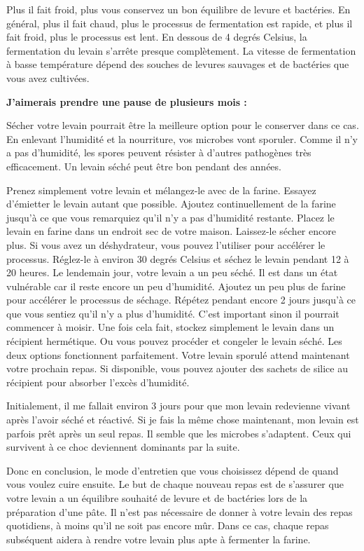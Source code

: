Plus il fait froid, plus vous conservez un bon équilibre de levure et
bactéries. En général, plus il fait chaud, plus le processus de fermentation est rapide,
et plus il fait froid, plus le processus est lent.
En dessous de 4 degrés Celsius, la fermentation du levain s'arrête presque complètement. La
vitesse de fermentation à basse température dépend des
souches de levures sauvages et de bactéries
que vous avez cultivées.

\textbf{J'aimerais prendre une pause de plusieurs mois :}

Sécher votre levain pourrait être la meilleure option pour le conserver dans ce cas. En
enlevant l'humidité et la nourriture, vos microbes vont sporuler. Comme il n'y a pas
d'humidité, les spores peuvent résister à d'autres pathogènes très efficacement. Un levain séché peut
être bon pendant des années.

Prenez simplement votre levain et mélangez-le avec de la farine. Essayez d'émietter le levain autant
que possible. Ajoutez continuellement de la farine jusqu'à ce que vous remarquiez qu'il n'y a pas
d'humidité restante. Placez le levain en farine dans un endroit sec de votre maison. Laissez-le
sécher encore plus. Si vous avez un déshydrateur, vous pouvez l'utiliser pour accélérer le
processus. Réglez-le à environ 30 degrés Celsius et séchez le levain pendant 12 à 20 heures. Le lendemain
jour, votre levain a un peu séché. Il est dans un état vulnérable car il reste encore un peu
d'humidité. Ajoutez un peu plus de farine pour accélérer le processus de séchage. Répétez
pendant encore 2 jours jusqu'à ce que vous sentiez qu'il n'y a plus d'humidité. C'est
important sinon il pourrait commencer à moisir. Une fois cela fait, stockez simplement le
levain dans un récipient hermétique. Ou vous pouvez procéder et congeler
le levain séché. Les deux options fonctionnent parfaitement. Votre levain sporulé
attend maintenant votre prochain repas. Si disponible, vous pouvez ajouter des sachets de silice
au récipient pour absorber l'excès d'humidité.

Initialement, il me fallait environ 3 jours pour que mon levain redevienne vivant après
l'avoir séché et réactivé. Si je fais la même chose maintenant, mon levain est
parfois prêt après un seul repas. Il semble que les microbes s'adaptent. Ceux qui
survivent à ce choc deviennent dominants par la suite.

Donc en conclusion, le mode d'entretien que vous choisissez dépend de quand vous voulez cuire ensuite.
Le but de chaque nouveau repas est de s'assurer que votre levain
a un équilibre souhaité de levure et de bactéries lors de la préparation d'une pâte. Il n'est pas nécessaire de donner à votre
levain des repas quotidiens, à moins qu'il ne soit pas encore mûr. Dans ce cas, chaque
repas subséquent aidera à rendre votre levain plus apte à fermenter
la farine.